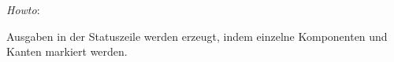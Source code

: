\emph{Howto}:

Ausgaben in der Statuszeile werden erzeugt, indem einzelne Komponenten und Kanten
markiert werden.